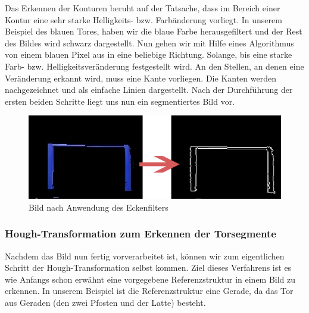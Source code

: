 \documentclass[a4paper,12pt]{article}
\begin{document}
Das Erkennen der Konturen beruht auf der Tatsache, dass im Bereich einer Kontur eine sehr starke Helligkeits- bzw. Farbänderung vorliegt. In unserem Beispiel des blauen Tores, haben wir die blaue Farbe herausgefiltert und der Rest des Bildes wird schwarz dargestellt. Nun gehen wir mit Hilfe eines Algorithmus von einem blauen Pixel aus in eine beliebige Richtung. Solange, bis eine starke Farb- bzw. Helligkeitsveränderung festgestellt wird. An den Stellen, an denen eine Veränderung erkannt wird, muss eine Kante vorliegen. Die Kanten werden nachgezeichnet und als einfache Linien dargestellt. Nach der Durchführung der ersten beiden Schritte liegt uns nun ein segmentiertes Bild vor.
\begin{figure}[H]
\includegraphics[scale=0.6]{eckenfilter.jpg}
\caption{Bild nach Anwendung des Eckenfilters}
\label{fig:eckenfilter}
\end{figure}
\subsubsection{Hough-Transformation zum Erkennen der Torsegmente}
Nachdem das Bild nun fertig vorverarbeitet ist, können wir zum eigentlichen Schritt der Hough-Transformation selbst kommen. Ziel dieses Verfahrens ist es wie Anfangs schon erwähnt eine vorgegebene Referenzstruktur in einem Bild zu erkennen. In unserem Beispiel ist die Referenzstruktur eine Gerade, da das Tor aus Geraden (den zwei Pfosten und der Latte) besteht.
\end{document}
